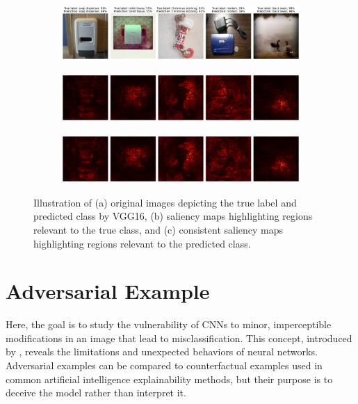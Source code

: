 \begin{figure}[H]
    \centering
    \begin{subfigure}{0.95\textwidth}
        \includegraphics[width=\textwidth]{bad_images_vgg16}
        \caption{}
        \label{subfig:bad_images_vgg16}
    \end{subfigure}
    \begin{subfigure}{0.95\textwidth}
        \includegraphics[width=\textwidth]{bad_true_class_saliency_vgg16}
        \caption{}
        \label{subfig:bad_true_class_saliency_vgg16}
    \end{subfigure}
    \begin{subfigure}{0.95\textwidth}
        \includegraphics[width=\textwidth]{bad_predicted_class_saliency_vgg16}
        \caption{}
        \label{subfig:bad_predicted_class_saliency_vgg16}
    \end{subfigure}
    \caption{Illustration of (a) original images depicting the true label and predicted class by VGG16, (b) saliency maps highlighting regions relevant to the true class, and (c) consistent saliency maps highlighting regions relevant to the predicted class.}
    \label{fig:bad_saliency_map_vgg16}
\end{figure}


\section{Adversarial Example}

Here, the goal is to study the vulnerability of CNNs to minor, imperceptible modifications in an image that lead to misclassification. This concept, introduced by \cite{szegedy2014intriguing}, reveals the limitations and unexpected behaviors of neural networks. Adversarial examples can be compared to counterfactual examples used in common artificial intelligence explainability methods, but their purpose is to deceive the model rather than interpret it.


